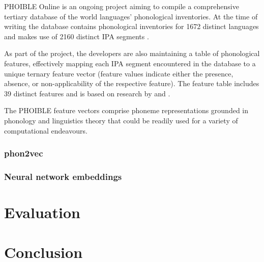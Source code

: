 \documentclass[a4paper]{report}
\begin{document}
PHOIBLE Online is an ongoing project aiming to compile a comprehensive tertiary database of the world languages' phonological inventories.
At the time of writing the database contains phonological inventories for 1672 distinct languages and makes use of 2160 distinct IPA segments \citep{2014_Moran_al}.

As part of the project, the developers are also maintaining a table of phonological features,
effectively mapping each IPA segment encountered in the database to a unique ternary feature vector
(feature values indicate either the presence, absence, or non-applicability of the respective feature).
The feature table includes 39 distinct features and is based on research by \citet{2009_Bruce} and \citet{2011_Moisik_al}.

The PHOIBLE feature vectors comprise phoneme representations grounded in phonology and linguistics theory
that could be readily used for a variety of computational endeavours.


\subsection{phon2vec}


\subsection{Neural network embeddings}


\chapter{Evaluation}


\chapter{Conclusion}



\end{document}
